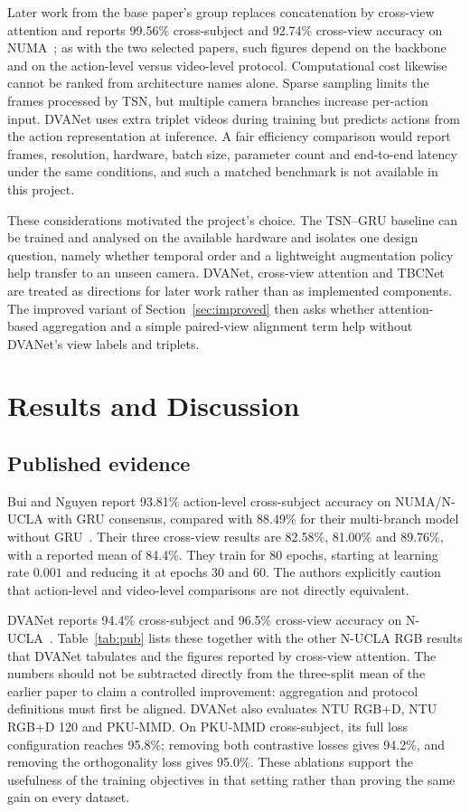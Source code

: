 \documentclass[runningheads]{llncs}
\begin{document}
Later work from the base paper's group replaces concatenation by cross-view attention and reports 99.56\% cross-subject and 92.74\% cross-view accuracy on NUMA~\cite{cva}; as with the two selected papers, such figures depend on the backbone and on the action-level versus video-level protocol. Computational cost likewise cannot be ranked from architecture names alone. Sparse sampling limits the frames processed by TSN, but multiple camera branches increase per-action input. DVANet uses extra triplet videos during training but predicts actions from the action representation at inference. A fair efficiency comparison would report frames, resolution, hardware, batch size, parameter count and end-to-end latency under the same conditions, and such a matched benchmark is not available in this project.

These considerations motivated the project's choice. The TSN--GRU baseline can be trained and analysed on the available hardware and isolates one design question, namely whether temporal order and a lightweight augmentation policy help transfer to an unseen camera. DVANet, cross-view attention and TBCNet are treated as directions for later work rather than as implemented components. The improved variant of Section~\ref{sec:improved} then asks whether attention-based aggregation and a simple paired-view alignment term help without DVANet's view labels and triplets.

\section{Results and Discussion}\label{sec:res}
\subsection{Published evidence}
Bui and Nguyen report 93.81\% action-level cross-subject accuracy on NUMA/N-UCLA with GRU consensus, compared with 88.49\% for their multi-branch model without GRU~\cite{bui}. Their three cross-view results are 82.58\%, 81.00\% and 89.76\%, with a reported mean of 84.4\%. They train for 80 epochs, starting at learning rate $0.001$ and reducing it at epochs 30 and 60. The authors explicitly caution that action-level and video-level comparisons are not directly equivalent.

DVANet reports 94.4\% cross-subject and 96.5\% cross-view accuracy on N-UCLA~\cite{dva}. Table~\ref{tab:pub} lists these together with the other N-UCLA RGB results that DVANet tabulates and the figures reported by cross-view attention. The numbers should not be subtracted directly from the three-split mean of the earlier paper to claim a controlled improvement: aggregation and protocol definitions must first be aligned. DVANet also evaluates NTU RGB+D, NTU RGB+D 120 and PKU-MMD. On PKU-MMD cross-subject, its full loss configuration reaches 95.8\%; removing both contrastive losses gives 94.2\%, and removing the orthogonality loss gives 95.0\%. These ablations support the usefulness of the training objectives in that setting rather than proving the same gain on every dataset.
\end{document}
